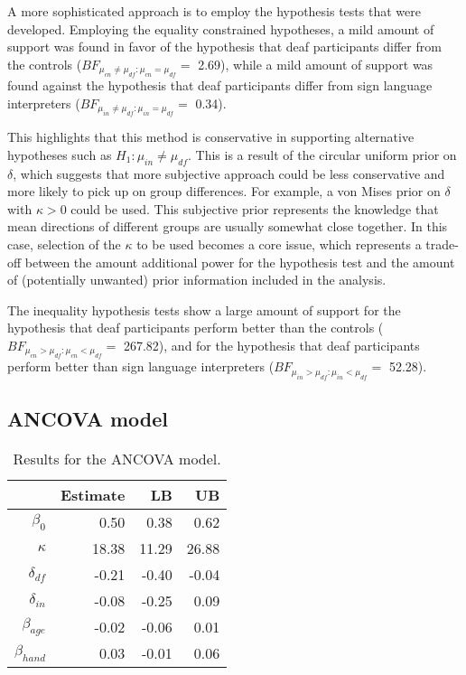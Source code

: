 \documentclass[11pt,a4paper]{article}\usepackage[]{graphicx}\usepackage[]{color}
\begin{document}
A more sophisticated approach is to employ the hypothesis tests that were developed. Employing the equality constrained hypotheses, a mild amount of support was found in favor of the hypothesis that deaf participants differ from the controls (\( BF_{\mu_{cn} \neq \mu_{df}:\mu_{cn} = \mu_{df}} = \) 2.69), while  a mild amount of support was found against  the hypothesis that deaf participants differ from sign language interpreters  (\( BF_{\mu_{in} \neq \mu_{df}:\mu_{in} = \mu_{df}} = \) 0.34).

This highlights that this method is conservative in supporting alternative hypotheses such as \( H_1 : \mu_{in} \neq \mu_{df}.\) This is a result of the circular uniform prior on \( \delta \), which suggests that more subjective approach could be less conservative and more likely to pick up on group differences. For example, a von Mises prior on \( \delta \) with \( \kappa > 0\) could be used. This subjective prior represents the knowledge that mean directions of different groups are usually somewhat close together. In this case, selection of the \( \kappa \) to be used becomes a core issue, which represents a trade-off between the amount additional power for the hypothesis test and the amount of (potentially unwanted) prior information included in the analysis.

The inequality hypothesis tests show a large amount of support for the hypothesis that deaf participants perform better than the controls (\( BF_{\mu_{cn} > \mu_{df}:\mu_{cn} < \mu_{df}} = \) 267.82), and for the hypothesis that deaf participants perform better than sign language interpreters (\( BF_{\mu_{in} > \mu_{df}:\mu_{in} < \mu_{df}} = \) 52.28).





\subsection{ANCOVA model}




\begin{table}[btp]
\centering
\caption{Results for the ANCOVA model.} 
\label{ANCOVATable}
\begin{tabular}{rrrr}
  \toprule
 & Estimate & LB & UB \\ 
  \midrule
$\beta_0$ & 0.50 & 0.38 & 0.62 \\ 
  $\kappa$ & 18.38 & 11.29 & 26.88 \\ 
  $\delta_{df}$ & -0.21 & -0.40 & -0.04 \\ 
  $\delta_{in}$ & -0.08 & -0.25 & 0.09 \\ 
  $\beta_{age}$ & -0.02 & -0.06 & 0.01 \\ 
  $\beta_{hand}$ & 0.03 & -0.01 & 0.06 \\ 
   \bottomrule
\end{tabular}
\end{table}
\end{document}
